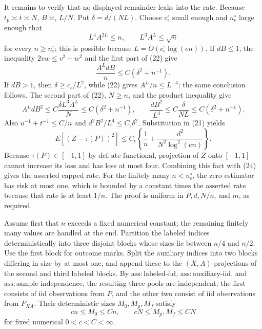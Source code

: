 It remains to verify that no displayed remainder leaks into the rate.
Because \(t_p\asymp t\asymp N\),
\(B\asymp_\epsilon L/N\).  Put
\(\delta=d/(NL)\).  Choose \(c_\epsilon^\circ\) small enough and
\(n_\epsilon^\circ\) large enough that
\[
 L^4A^{2L}\le n,\qquad L^3A^L\le\sqrt n                         \tag{22}
\]
for every \(n\ge n_\epsilon^\circ\); this is possible because
\(L=O(c_\epsilon^\circ\log(en))\).  If \(dB\le1\), the inequality
\(2vw\le v^2+w^2\) and the first part of (22) give
\[
 \frac{A^LdB}{n}\le C(\delta^2+n^{-1}).
\]
If \(dB>1\), then \(\delta\ge c_\epsilon/L^2\), while (22) gives
\(A^L/n\le L^{-4}\); the same conclusion follows.  The second part
of (22), \(N\ge n\), and the product inequality give
\[
 A^LdB^2\le C\frac{\delta L^3A^L}{N}
 \le C(\delta^2+n^{-1}),
 \qquad
 \frac{dB^2}{L^4}\le C\frac{\delta}{NL}
 \le C(\delta^2+n^{-1}).                         \tag{23}
\]
Also \(u^{-1}+t^{-1}\le C/n\) and
\(d^2B^2/L^4\le C_\epsilon\delta^2\).  Substitution in (21) yields
\[
 E[(Z-\tau(P))^2]\le C_\epsilon
 \left\{\frac1n+\frac{d^2}{N^2\log^2(en)}\right\}.             \tag{24}
\]
Because \(\tau(P)\in[-1,1]\) by \(\mathrm{def:ate\mbox{-}functional}\),
projection of \(Z\) onto \([-1,1]\) cannot increase its loss and has
loss at most four.  Combining this fact with (24) gives the asserted
capped rate.  For the finitely many \(n<n_\epsilon^\circ\), the zero
estimator has risk at most one, which is bounded by a constant times
the asserted rate because that rate is at least \(1/n\).  The proof is
uniform in \(P,d,N/n\), and \(m\), as required.

Assume first that \(n\) exceeds a fixed numerical constant; the
remaining finitely many values are handled at the end.  Partition the
labeled indices deterministically into three disjoint blocks whose
sizes lie between \(n/4\) and \(n/2\).  Use the first block for outcome
marks.  Split the auxiliary indices into two blocks differing in size
by at most one, and append these to the \((X,A)\)-projections of the
second and third labeled blocks.  By \(\mathrm{ass:labeled\mbox{-}iid}\),
\(\mathrm{ass:auxiliary\mbox{-}iid}\), and
\(\mathrm{ass:sample\mbox{-}independence}\), the resulting three
pools are independent; the first consists of iid observations from
\(P\), and the other two consist of iid observations from \(P_{XA}\).
Their deterministic sizes \(M_0,M_p,M_f\) satisfy
\[
 c n\le M_0\le Cn,
 \qquad cN\le M_p,M_f\le CN                         \tag{25}
\]
for fixed numerical \(0<c<C<\infty\).

